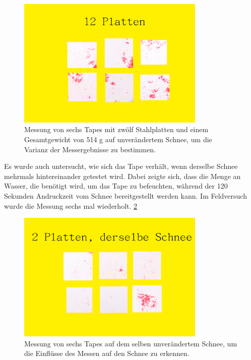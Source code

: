 \begin{figure}[H]
    \centering
    \includegraphics[width=0.8\textwidth]{Bilder/12Platten.png}
    \caption{Messung von sechs Tapes mit  zwölf Stahlplatten und einem Gesamtgewicht von 514 g auf unverändertem Schnee, um die Varianz der Messergebnisse zu bestimmen.} 
    \label{fig:12Palt}
\end{figure}

\newpage
Es wurde auch untersucht, wie sich das Tape verhält, wenn derselbe Schnee mehrmals hintereinander getestet wird. Dabei zeigte sich, dass die Menge an Wasser, die benötigt wird, um das Tape zu befeuchten, während der 120 Sekunden Andruckzeit vom Schnee bereitgestellt werden kann. Im Feldversuch wurde die Messung sechs mal wiederholt. \ref{fig:aufbauTitlis}


\begin{figure}[H]
    \centering
    \includegraphics[width=0.8\textwidth]{Bilder/2PlattenSelberSchnee.png}
    \caption{Messung von sechs Tapes auf dem selben unverändertem Schnee, um die Einflüsse des Messen auf den Schnee zu erkennen.} 
    \label{fig:aufbauTitlis}
\end{figure}

